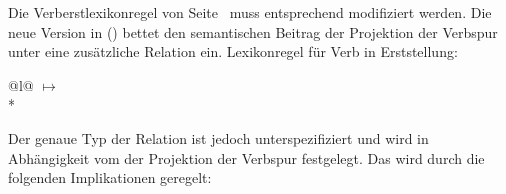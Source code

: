 Die Verberstlexikonregel von Seite~\pageref{lr-verb-movement2} muss entsprechend modifiziert werden.
Die neue Version in () bettet den semantischen Beitrag der Projektion der Verbspur 
unter eine zusätzliche Relation ein.
\eas
\label{lr-verb-movement3}
Lexikonregel für Verb in Erststellung:\\
\begin{tabular}[t]{@{}l@{}}
 $\mapsto$\\*
\end{tabular}
\zs
Der genaue Typ der Relation ist jedoch unterspezifiziert und wird in Abhängigkeit vom
\slashw der Projektion der Verbspur festgelegt. Das wird durch die folgenden Implikationen geregelt:

